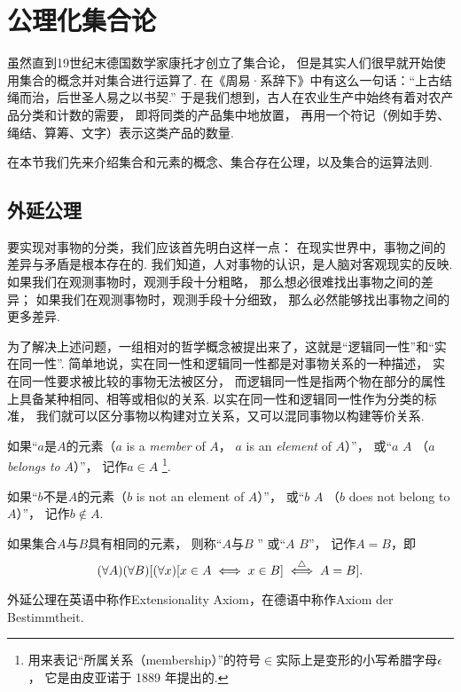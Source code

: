 \section{公理化集合论}
虽然直到19世纪末德国数学家康托才创立了集合论，
但是其实人们很早就开始使用集合的概念并对集合进行运算了.
在《周易·系辞下》中有这么一句话：“上古结绳而治，后世圣人易之以书契.”
于是我们想到，古人在农业生产中始终有着对农产品分类和计数的需要，
即将同类的产品集中地放置，
再用一个符记（例如手势、绳结、算筹、文字）表示这类产品的数量.

在本节我们先来介绍集合和元素的概念、集合存在公理，以及集合的运算法则.

\subsection{外延公理}
要实现对事物的分类，我们应该首先明白这样一点：
在现实世界中，事物之间的差异与矛盾是根本存在的.
我们知道，人对事物的认识，是人脑对客观现实的反映.
如果我们在观测事物时，观测手段十分粗略，
那么想必很难找出事物之间的差异；
如果我们在观测事物时，观测手段十分细致，
那么必然能够找出事物之间的更多差异.

为了解决上述问题，一组相对的哲学概念被提出来了，这就是“逻辑同一性”和“实在同一性”.
简单地说，实在同一性和逻辑同一性都是对事物关系的一种描述，
实在同一性要求被比较的事物无法被区分，
而逻辑同一性是指两个物在部分的属性上具备某种相同、相等或相似的关系.
以实在同一性和逻辑同一性作为分类的标准，
我们就可以区分事物以构建对立关系，又可以混同事物以构建等价关系.

\begin{definition}
如果“\(a\)是\(A\)的元素（\(a\) is a \emph{member} of \(A\)，
\(a\) is an \emph{element} of \(A\)）”，
或“\(a\)  \(A\)
（\(a\) \emph{belongs to} \(A\)）”，
记作\(a \in A\)
\footnote{
	用来表记“所属关系（membership）”的符号\(\in\)实际上是变形的小写希腊字母\(\epsilon\)，
	它是由皮亚诺于 1889 年提出的.
}.
\end{definition}

\begin{definition}
如果“\(b\)不是\(A\)的元素（\(b\) is not an element of \(A\)）”，
或“\(b\)  \(A\)
（\(b\) does not belong to \(A\)）”，
记作\(b \notin A\).
\end{definition}

\begin{axiom}[外延公理I]
如果集合\(A\)与\(B\)具有相同的元素，
则称“\(A\)与\(B\) ”
或“\(A\)  \(B\)”，
记作\(A=B\)，即
\begin{equation*}
	(\forall A)(\forall B)[
		(\forall x)[x \in A \iff x \in B]
		\overset{\triangle}{\iff}
		A=B
	].
\end{equation*}
\end{axiom}
外延公理在英语中称作Extensionality Axiom，在德语中称作Axiom der Bestimmtheit.

